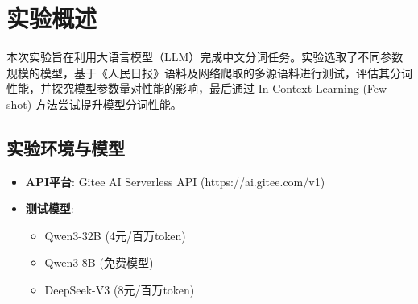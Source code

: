 \documentclass[11pt]{article}
\begin{document}


\section{实验概述}
本次实验旨在利用大语言模型（LLM）完成中文分词任务。实验选取了不同参数规模的模型，基于《人民日报》语料及网络爬取的多源语料进行测试，评估其分词性能，并探究模型参数量对性能的影响，最后通过 In-Context Learning (Few-shot) 方法尝试提升模型分词性能。

\subsection{实验环境与模型}
\begin{itemize}
    \item \textbf{API平台}: Gitee AI Serverless API (https://ai.gitee.com/v1)
    \item \textbf{测试模型}: 
    \begin{itemize}
        \item Qwen3-32B (4元/百万token)
        \item Qwen3-8B (免费模型)
        \item DeepSeek-V3 (8元/百万token)
    \end{itemize}
\end{itemize}
\end{document}
